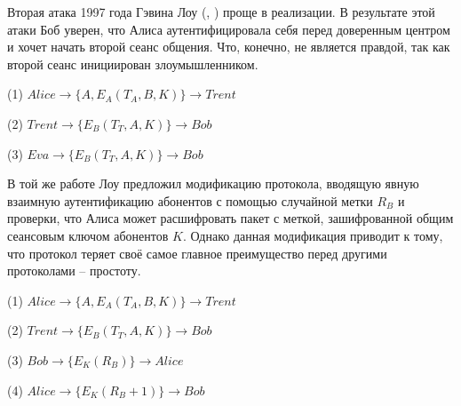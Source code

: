 Вторая атака 1997 года Гэвина Лоу (, \cite{Lowe:1997}) проще в реализации. В результате этой атаки Боб уверен, что Алиса аутентифицировала себя перед доверенным центром и хочет начать второй сеанс общения. Что, конечно, не является правдой, так как второй сеанс инициирован злоумышленником.

\begin{protocol}
	\item[(1)] $Alice \to \{ A, E_A \left( T_A, B, K \right) \} \to Trent$
	\item[(2)] $Trent \to \{ E_B \left( T_T, A, K \right) \} \to Bob$
	\item[(3)] $Eva \to \{ E_B \left( T_T, A, K \right) \} \to Bob$
\end{protocol}

В той же работе Лоу предложил модификацию протокола, вводящую явную взаимную аутентификацию абонентов с помощью случайной метки $R_B$ и проверки, что Алиса может расшифровать пакет с меткой, зашифрованной общим сеансовым ключом абонентов $K$. Однако данная модификация приводит к тому, что протокол теряет своё самое главное преимущество перед другими протоколами -- простоту.

\begin{protocol}
	\item[(1)] $Alice \to \{ A, E_A \left( T_A, B, K \right) \} \to Trent$
	\item[(2)] $Trent \to \{ E_B \left( T_T, A, K \right) \} \to Bob$
	\item[(3)] $Bob \to \{ E_K \left( R_B \right) \} \to Alice$
	\item[(4)] $Alice \to \{ E_K \left( R_B + 1 \right) \} \to Bob$
\end{protocol}

